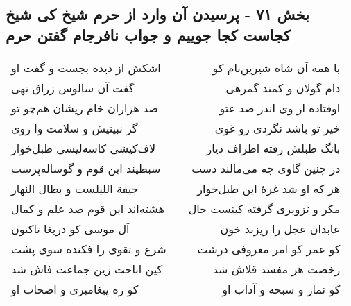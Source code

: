 \begin{center}
\section*{بخش ۷۱ - پرسیدن آن وارد از حرم شیخ کی شیخ کجاست کجا جوییم و جواب نافرجام گفتن حرم}
\label{sec:sh071}
\begin{longtable}{l p{0.5cm} r}
اشکش از دیده بجست و گفت او
&&
با همه آن شاه شیرین‌نام کو
\\
گفت آن سالوس زراق تهی
&&
دام گولان و کمند گمرهی
\\
صد هزاران خام ریشان هم‌چو تو
&&
اوفتاده از وی اندر صد عتو
\\
گر نبینیش و سلامت وا روی
&&
خیر تو باشد نگردی زو غوی
\\
لاف‌کیشی کاسه‌لیسی طبل‌خوار
&&
بانگ طبلش رفته اطراف دیار
\\
سبطیند این قوم و گوساله‌پرست
&&
در چنین گاوی چه می‌مالند دست
\\
جیفة اللیلست و بطال النهار
&&
هر که او شد غرهٔ این طبل‌خوار
\\
هشته‌اند این قوم صد علم و کمال
&&
مکر و تزویری گرفته کینست حال
\\
آل موسی کو دریغا تاکنون
&&
عابدان عجل را ریزند خون
\\
شرع و تقوی را فکنده سوی پشت
&&
کو عمر کو امر معروفی درشت
\\
کین اباحت زین جماعت فاش شد
&&
رخصت هر مفسد قلاش شد
\\
کو ره پیغامبری و اصحاب او
&&
کو نماز و سبحه و آداب او
\\
\end{longtable}
\end{center}
